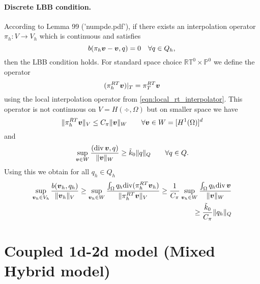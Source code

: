 \paragraph{Discrete LBB condition.}
According to Lemma 99 ('numpde.pdf'), if there exists an interpolation operator
$\pi_h: V\rightarrow V_h$ which is continuous and satisfies
\begin{equation}
    b(\pi_h\mathbf{\boldsymbol{v}}- \mathbf{\boldsymbol{v}}, q) = 0 \quad \forall q\in Q_h,\\ 
\end{equation}
then the LBB condition holds.
For standard space choice $\mathbb{RT}^0\times\mathbb{P}^0$ we define
the operator 
\begin{equation}
    (\pi^{RT}_h \mathbf{\boldsymbol{v}})|_T = \pi^{RT}_T \mathbf{\boldsymbol{v}}
\end{equation}
using the local interpolation operator from \eqref{eqn:local_rt_interpolator}.
This operator is not continuous on $V=H(\div,\Omega)$ but on
smaller space we have
\begin{equation}
    \| \pi^{RT}_h \mathbf{\boldsymbol{v}} \|_V \leq C_\pi \| \mathbf{\boldsymbol{v}} \|_W \qquad \forall \mathbf{\boldsymbol{v}}\in W=[H^1(\Omega)]^d
\end{equation}
and
\begin{equation}
    \sup_{\mathbf{\boldsymbol{v}}\in W} \frac{({\rm div}\,\mathbf{\boldsymbol{v}}, q)}{\| \mathbf{\boldsymbol{v}} \|_W} \geq \tilde{k}_0 \| q \|_Q \qquad \forall q\in Q.
\end{equation}
Using this we obtain for all $q_h\in Q_h$
\begin{align}
    \sup_{\mathbf{\boldsymbol{v}}_h\in V_h} \frac{b(\mathbf{\boldsymbol{v}}_h,q_h)}{\| \mathbf{\boldsymbol{v}}_h \|_V} \geq
    \sup_{\mathbf{\boldsymbol{v}}_h\in W} \frac{\int_{\Omega} q_h {\rm div} (\pi^{RT}_h \mathbf{\boldsymbol{v}}_h)}{\| \pi^{RT}_h \mathbf{\boldsymbol{v}} \|_V} \geq
    \frac{1}{C_\pi} \sup_{\mathbf{\boldsymbol{v}}_h\in W} \frac{\int_{\Omega} q_h {\rm div}\,\mathbf{\boldsymbol{v}}}{\| \mathbf{\boldsymbol{v}} \|_W}
    \nonumber\\ \geq \frac{\tilde{k}_0}{C_\pi}\| q_h \|_Q
\end{align}























\section{Coupled 1d-2d model (Mixed Hybrid model)}

